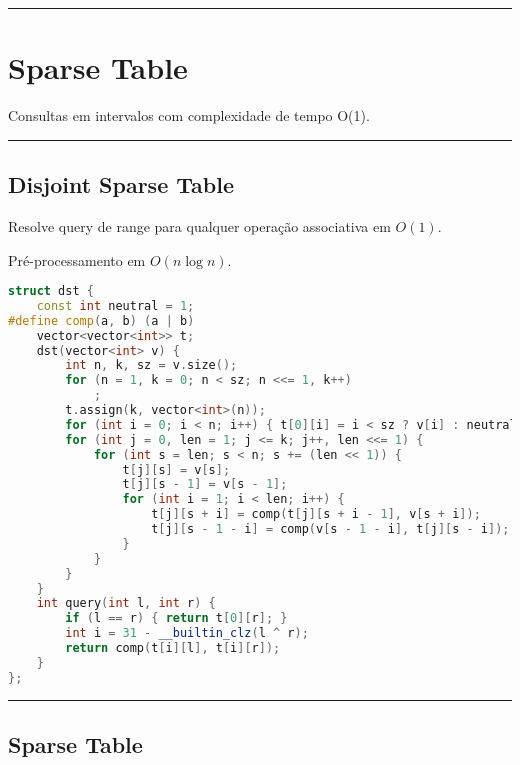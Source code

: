 \documentclass[11pt, a4paper, twoside]{book}
\begin{document}
\hfill

\rule{\textwidth}{0.4pt}

\section{Sparse Table}



Consultas em intervalos com complexidade de tempo O(1).


\hfill

\rule{\textwidth}{0.4pt}

\subsection{Disjoint Sparse Table}



Resolve query de range para qualquer operação associativa em $O(1)$.



Pré-processamento em $O(n \log n)$.

\hfill

\begin{lstlisting}[language=C++]
struct dst {
    const int neutral = 1;
#define comp(a, b) (a | b)
    vector<vector<int>> t;
    dst(vector<int> v) {
        int n, k, sz = v.size();
        for (n = 1, k = 0; n < sz; n <<= 1, k++)
            ;
        t.assign(k, vector<int>(n));
        for (int i = 0; i < n; i++) { t[0][i] = i < sz ? v[i] : neutral; }
        for (int j = 0, len = 1; j <= k; j++, len <<= 1) {
            for (int s = len; s < n; s += (len << 1)) {
                t[j][s] = v[s];
                t[j][s - 1] = v[s - 1];
                for (int i = 1; i < len; i++) {
                    t[j][s + i] = comp(t[j][s + i - 1], v[s + i]);
                    t[j][s - 1 - i] = comp(v[s - 1 - i], t[j][s - i]);
                }
            }
        }
    }
    int query(int l, int r) {
        if (l == r) { return t[0][r]; }
        int i = 31 - __builtin_clz(l ^ r);
        return comp(t[i][l], t[i][r]);
    }
};
\end{lstlisting}

\hfill

\rule{\textwidth}{0.4pt}

\subsection{Sparse Table}
\end{document}
